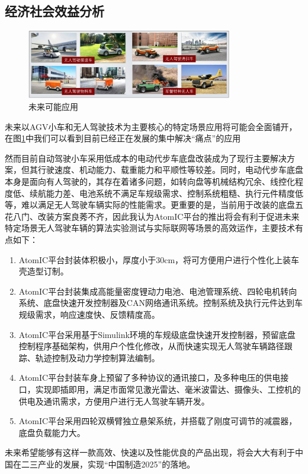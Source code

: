 \subsection{经济社会效益分析}

\begin{figure}[htbp]
	\centering
	\includegraphics[width = 0.8\textwidth]{fig/wlknyy.png}
	\caption{未来可能应用}
	\label{wlknyy}
\end{figure}

未来以AGV小车和无人驾驶技术为主要核心的特定场景应用将可能会全面铺开，在图\ref{wlknyy}中我们可以看到目前已经正在发展的集中解决“痛点”的应用

然而目前自动驾驶小车采用低成本的电动代步车底盘改装成为了现行主要解决方案，但其行驶速度、机动能力、载重能力和平顺性等较差。同时，电动代步车底盘本身是面向有人驾驶的，其存在着诸多问题，如转向盘等机械结构冗余、线控化程度低、续航能力差、电池系统不满足车规级需求、控制系统粗糙、执行元件精度低等，难以满足无人驾驶车辆实际的性能需求。更重要的是，当前用于改装的底盘五花八门、改装方案良莠不齐，因此我认为AtomIC平台的推出将会有利于促进未来特定场景无人驾驶车辆的算法实验测试与实际联网等场景的高效运作，主要技术有点如下：

\begin{enumerate}
	
	\item AtomIC平台封装体积极小，厚度小于30cm，将可方便用户进行个性化上装车壳造型订制。
	
	\item AtomIC平台封装集成高能量密度锂动力电池、电池管理系统、四轮电机转向系统、底盘快速开发控制器及CAN网络通讯系统。控制系统及执行元件达到车规级需求，响应速度快、反馈精度高。
	
	\item AtomIC平台采用基于Simulink环境的车规级底盘快速开发控制器，预留底盘控制程序基础架构，供用户个性化修改，从而快速实现无人驾驶车辆路径跟踪、轨迹控制及动力学控制算法编制。
	
	\item AtomIC平台封装车身上预留了多种协议的通讯接口，及多种电压的供电接口，实现即插即用，满足市面常见激光雷达、毫米波雷达、摄像头、工控机的供电及通讯需求，方便用户进行无人驾驶车辆开发。
	
	\item AtomIC平台采用四轮双横臂独立悬架系统，并搭载了刚度可调节的减震器，底盘负载能力大。
	
\end{enumerate}

未来希望能够有这样一款高效、快速以及性能优良的产品出现，将会大大有利于中国在二三产业的发展，实现“中国制造2025”的落地。